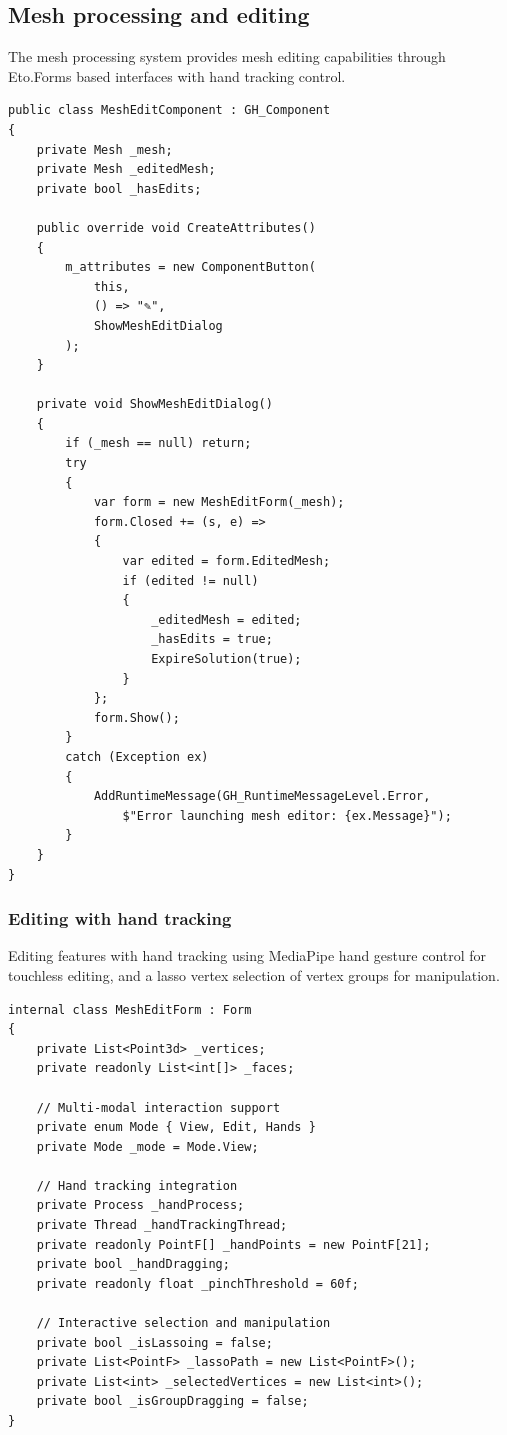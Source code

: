 \subsection{Mesh processing and editing}

The mesh processing system provides mesh editing capabilities through Eto.Forms based interfaces with hand tracking control.

\begin{verbatim}
public class MeshEditComponent : GH_Component
{
    private Mesh _mesh;
    private Mesh _editedMesh;
    private bool _hasEdits;

    public override void CreateAttributes()
    {
        m_attributes = new ComponentButton(
            this,
            () => "✎",
            ShowMeshEditDialog
        );
    }

    private void ShowMeshEditDialog()
    {
        if (_mesh == null) return;
        try
        {
            var form = new MeshEditForm(_mesh);
            form.Closed += (s, e) =>
            {
                var edited = form.EditedMesh;
                if (edited != null)
                {
                    _editedMesh = edited;
                    _hasEdits = true;
                    ExpireSolution(true);
                }
            };
            form.Show();
        }
        catch (Exception ex)
        {
            AddRuntimeMessage(GH_RuntimeMessageLevel.Error, 
                $"Error launching mesh editor: {ex.Message}");
        }
    }
}
\end{verbatim}

\subsubsection{Editing with hand tracking}

Editing features with hand tracking using MediaPipe hand gesture control for touchless editing, and a lasso vertex selection of vertex groups for manipulation.

\begin{verbatim}
internal class MeshEditForm : Form
{
    private List<Point3d> _vertices;
    private readonly List<int[]> _faces;
    
    // Multi-modal interaction support
    private enum Mode { View, Edit, Hands }
    private Mode _mode = Mode.View;
    
    // Hand tracking integration
    private Process _handProcess;
    private Thread _handTrackingThread;
    private readonly PointF[] _handPoints = new PointF[21];
    private bool _handDragging;
    private readonly float _pinchThreshold = 60f;
    
    // Interactive selection and manipulation
    private bool _isLassoing = false;
    private List<PointF> _lassoPath = new List<PointF>();
    private List<int> _selectedVertices = new List<int>();
    private bool _isGroupDragging = false;
}
\end{verbatim}

